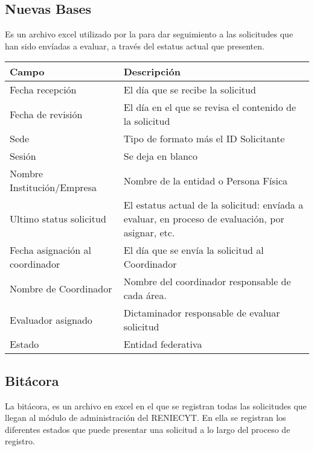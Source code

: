\subsection{Nuevas Bases}
\label{appendix:Reportes:DireccionRENIECYT:NuevasBases}

Es un archivo excel utilizado por la  para dar seguimiento a las solicitudes que han sido envíadas a evaluar, a través del estatus actual que presenten.\\



\begin{tabular}{ m{} m{}  }%
	\rowcolor{gray1} {\bf Campo} &  {\bf Descripción} \\ \hline \hline

	Fecha recepción & El día que se recibe la solicitud  \\
	\rowcolor{gray1} Fecha de revisión& El día en el que se revisa el contenido de la solicitud \\
	Sede& Tipo de formato más el ID Solicitante\\
	\rowcolor{gray1} Sesión & Se deja en blanco \\
	Nombre Institución/Empresa & Nombre de la entidad o Persona Física\\
	\rowcolor{gray1} Ultimo status solicitud& El estatus actual de la solicitud: envíada a evaluar, en proceso de evaluación, por asignar, etc.\\
	Fecha asignación al coordinador & El día que se envía la solicitud al Coordinador \\
	\rowcolor{gray1} Nombre de Coordinador & Nombre del coordinador responsable de cada área.\\
	Evaluador asignado & Dictaminador responsable de evaluar solicitud\\
	\rowcolor{gray1} Estado& Entidad federativa\\
\end{tabular}

\subsection{Bitácora}
\label{appendix:Reportes:DireccionRENIECYT:BitacoraDiaria}

La bitácora, es un archivo en excel en el que se registran todas las solicitudes que llegan al módulo de administración del RENIECYT. En ella se registran los diferentes estados que puede presentar una solicitud a lo largo del proceso de registro.\\

